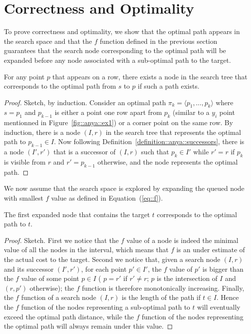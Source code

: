 \section{Correctness and Optimality}

To prove correctness and optimality, 
we show that the optimal path 
appears in the search space 
and that the $f$ function defined in the previous section 
guarantees that the search node 
corresponding to the optimal path 
will be expanded before any node 
associated with a sub-optimal path to the target.  

\begin{theorem}
  For any point $p$ that appears on a row, 
  there exists a node in the search tree 
  that corresponds to the optimal path from $s$ to $p$ 
  if such a path exists.  
\end{theorem}

\begin{proof}
  Sketch, by induction.  
  Consider an optimal path 
  $\pi_k = \langle p_1,\dots,p_k\rangle$ 
  where $s = p_1$ and $p_{k-1}$ is either a point 
  one row apart from $p_k$ (similar to a $y_i$ point
  mentionned in Figure~\ref{fig::anya::ex1}) or a corner point on the same row.  
  By induction, there is a node $(I,r)$ in the search tree 
  that represents the optimal path to $p_{k-1} \in I$.  
  Now following Definition~\ref{definition::anya::successors}, 
  there is a node $(I',r')$ 
  that is a successor of $(I,r)$ 
  such that $p_k \in I'$ while $r' = r$ if $p_k$ is visible from $r$ 
  and $r' = p_{k-1}$ otherwise, and the node represents the optimal path.  
\end{proof}

We now assume that the search space is explored 
by expanding the queued node with smallest $f$ value 
as defined in Equation~(\ref{eq::f}).  

\begin{theorem}
  The first expanded node 
  that contains the target $t$ 
  corresponds to the optimal path to $t$.  
\end{theorem}

\begin{proof}
  Sketch.  
  First we notice that the $f$ value of a node 
  is indeed the minimal value of all the nodes in the interval, 
  which means that $f$ is an under estimate of the actual cost 
  to the target.  
  Second we notice that, given a search node $(I,r)$ 
  and its successor $(I',r')$, 
  for each point $p' \in I'$, 
  the $f$ value of $p'$ is bigger 
  than the $f$ value of some point $p \in I$ 
  (%
  $p = r'$ if $r' \neq r$; 
  $p$ is the intersection of $I$ and $(r,p')$ otherwise); 
  the $f$ function is therefore monotonically increasing.  
  Finally, the $f$ function of a search node $(I,r)$ 
  is the length of the path if $t \in I$.  
  Hence the $f$ function of the nodes representing 
  a sub-optimal path to $t$ 
  will eventually exceed the optimal path distance, 
  while the $f$ function of the nodes representing the optimal path 
  will always remain under this value.  
\end{proof}

